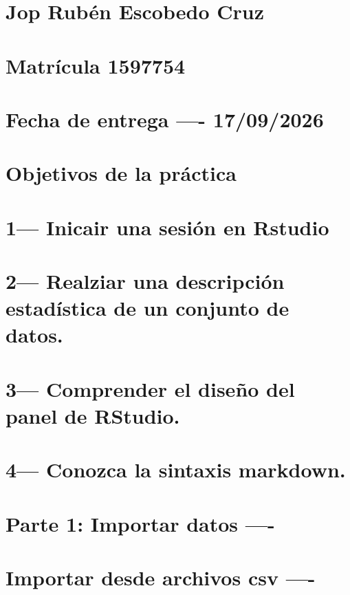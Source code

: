 \documentclass[
]{article}
\author{}
\date{\vspace{-2.5em}}
\begin{document}
\section{Jop Rubén Escobedo Cruz}\label{jop-rubuxe9n-escobedo-cruz}

\section{Matrícula 1597754}\label{matruxedcula-1597754}

\section{Fecha de entrega ----
17/09/2026}\label{fecha-de-entrega---17092026}

\section{Objetivos de la práctica}\label{objetivos-de-la-pruxe1ctica}

\section{1--- Inicair una sesión en
Rstudio}\label{inicair-una-sesiuxf3n-en-rstudio}

\section{2--- Realziar una descripción estadística de un conjunto de
datos.}\label{realziar-una-descripciuxf3n-estaduxedstica-de-un-conjunto-de-datos.}

\section{3--- Comprender el diseño del panel de
RStudio.}\label{comprender-el-diseuxf1o-del-panel-de-rstudio.}

\section{4--- Conozca la sintaxis
markdown.}\label{conozca-la-sintaxis-markdown.}

\section{Parte 1: Importar datos ----}\label{parte-1-importar-datos--}

\section{Importar desde archivos csv
----}\label{importar-desde-archivos-csv--}
\end{document}
